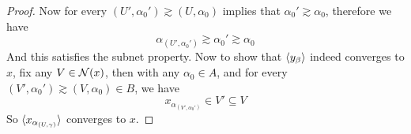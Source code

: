 \documentclass[../../main.tex]{subfiles}
\begin{document}
\begin{proof}
Now for every $(U',\alpha_0')\gtrsim(U,\alpha_0)$ implies that $\alpha_0'\gtrsim\alpha_0$, therefore we have 
\[
\alpha_{(U',\alpha_0')}\gtrsim\alpha_0'\gtrsim\alpha_0
\]
And this satisfies the subnet property. Now to show that $\langle {y_\beta} \rangle$ indeed converges to $x$, fix any $V\in\mathcal{N}({x})$, then with any $\alpha_0\in A$, and for every $(V',\alpha_0')\gtrsim(V,\alpha_0)\in B$, we have
\[
x_{\alpha_{(V',\alpha_0')}}\in V'\subseteq V
\]
So $\langle {x_{\alpha_{(U,\gamma)}}} \rangle$ converges to $x$.
\end{proof}
\end{document}
